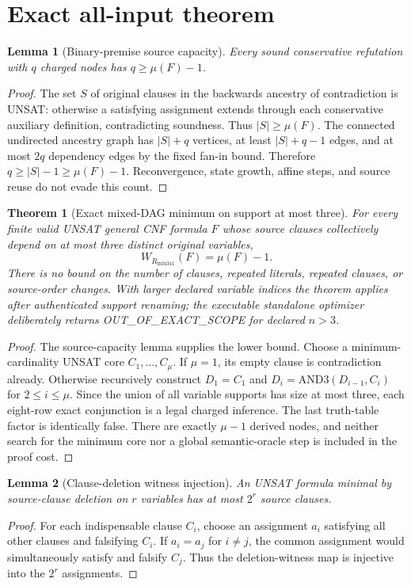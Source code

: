 \documentclass[11pt]{article}
\newtheorem{theorem}{Theorem}
\newtheorem{lemma}{Lemma}
\newcommand{\WR}{W_{R_{\mathrm{mix341}}}}
\begin{document}
\section{Exact all-input theorem}
\begin{lemma}[Binary-premise source capacity]
Every sound conservative refutation with $q$ charged nodes has $q\ge\mu(F)-1$.
\end{lemma}
\begin{proof}
The set $S$ of original clauses in the backwards ancestry of contradiction is UNSAT: otherwise a satisfying assignment extends through each conservative auxiliary definition, contradicting soundness. Thus $|S|\ge\mu(F)$. The connected undirected ancestry graph has $|S|+q$ vertices, at least $|S|+q-1$ edges, and at most $2q$ dependency edges by the fixed fan-in bound. Therefore $q\ge |S|-1\ge\mu(F)-1$. Reconvergence, state growth, affine steps, and source reuse do not evade this count.
\end{proof}
\begin{theorem}[Exact mixed-DAG minimum on support at most three]
For every finite valid UNSAT general CNF formula $F$ whose source clauses collectively depend on at most three distinct original variables,
\[
\boxed{\WR(F)=\mu(F)-1.}
\]
There is no bound on the number of clauses, repeated literals, repeated clauses, or source-order changes. With larger declared variable indices the theorem applies after authenticated support renaming; the executable standalone optimizer deliberately returns OUT\_OF\_EXACT\_SCOPE for declared $n>3$.
\end{theorem}
\begin{proof}
The source-capacity lemma supplies the lower bound. Choose a minimum-cardinality UNSAT core $C_1,\ldots,C_\mu$. If $\mu=1$, its empty clause is contradiction already. Otherwise recursively construct $D_1=C_1$ and $D_i=\mathrm{AND3}(D_{i-1},C_i)$ for $2\le i\le\mu$. Since the union of all variable supports has size at most three, each eight-row exact conjunction is a legal charged inference. The last truth-table factor is identically false. There are exactly $\mu-1$ derived nodes, and neither search for the minimum core nor a global semantic-oracle step is included in the proof cost.
\end{proof}
\begin{lemma}[Clause-deletion witness injection]
An UNSAT formula minimal by source-clause deletion on $r$ variables has at most $2^r$ source clauses.
\end{lemma}
\begin{proof}
For each indispensable clause $C_i$, choose an assignment $a_i$ satisfying all other clauses and falsifying $C_i$. If $a_i=a_j$ for $i\ne j$, the common assignment would simultaneously satisfy and falsify $C_j$. Thus the deletion-witness map is injective into the $2^r$ assignments.
\end{proof}
\end{document}
